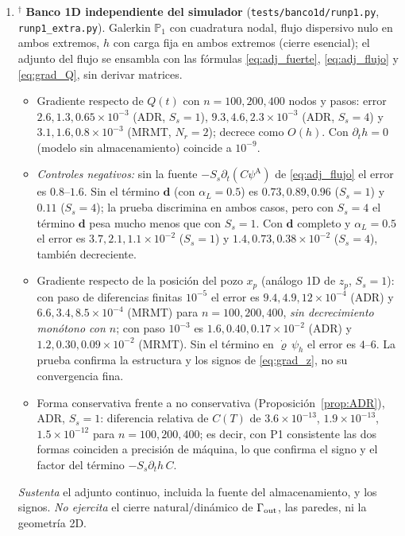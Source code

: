 \documentclass[11pt]{article}
\numberwithin{equation}{section}
\theoremstyle{plain}
\theoremstyle{definition}
\theoremstyle{remark}
\newcommand{\bd}{\mathbf{d}}
\newcommand{\Nuc}{\varrho}                      %
\newcommand{\pA}{\psi^{\mathrm A}}          %
\begin{document}
\begin{enumerate}[label=\textbf{V\arabic*.},leftmargin=*,itemsep=0.6em]
\item$^\dagger$ \textbf{Banco 1D independiente del simulador} (\texttt{tests/banco1d/runp1.py}, \texttt{runp1\_extra.py}). Galerkin $\mathbb P_1$ con cuadratura nodal, flujo dispersivo nulo en ambos extremos, $h$
  con carga fija en ambos extremos (cierre esencial); el adjunto del flujo se ensambla con las fórmulas \eqref{eq:adj_fuerte}, \eqref{eq:adj_flujo} y
  \eqref{eq:grad_Q}, sin derivar matrices.
  \begin{itemize}[nosep]
  \item Gradiente respecto de $Q(t)$ con $n=100,200,400$ nodos y pasos: error
  $2.6,1.3,0.65\times10^{-3}$ (ADR, $S_s=1$), $9.3,4.6,2.3\times10^{-3}$ (ADR, $S_s=4$) y $3.1,1.6,0.8\times10^{-3}$ (MRMT, $N_r=2$); decrece como $O(h)$.
  Con $\partial_th=0$ (modelo sin almacenamiento) coincide a $10^{-9}$.
  \item \emph{Controles negativos:} sin la fuente $-S_s\partial_t(C\pA)$ de \eqref{eq:adj_flujo} el error es $0.8$--$1.6$. Sin el término $\bd$ (con $\alpha_L=0.5$) es $0.73,0.89,0.96$ ($S_s=1$) y $0.11$ ($S_s=4$);
  la prueba discrimina en ambos casos, pero con $S_s=4$ el término $\bd$ pesa mucho menos que con $S_s=1$.
  Con $\bd$ completo y $\alpha_L=0.5$ el error es $3.7,2.1,1.1\times10^{-2}$ ($S_s=1$) y $1.4,0.73,0.38\times10^{-2}$ ($S_s=4$), también decreciente.
  \item Gradiente respecto de la posición del pozo $x_p$ (análogo 1D de $z_p$, $S_s=1$): con paso de diferencias finitas $10^{-5}$ el error es $9.4,4.9,12\times10^{-4}$ (ADR) y $6.6,3.4,8.5\times10^{-4}$ (MRMT) para $n=100,200,400$, \emph{sin decrecimiento monótono con $n$};
  con paso $10^{-3}$ es $1.6,0.40,0.17\times10^{-2}$ (ADR) y $1.2,0.30,0.09\times10^{-2}$ (MRMT). Sin el término en $\dot\Nuc\,\psi_h$ el error es $4$--$6$.
  La prueba confirma la estructura y los signos de \eqref{eq:grad_z}, no su convergencia fina.
  \item Forma conservativa frente a no conservativa (Proposición~\ref{prop:ADR}), ADR, $S_s=1$: diferencia relativa de $C(T)$ de $3.6\times10^{-13}$, $1.9\times10^{-13}$, $1.5\times10^{-12}$ para $n=100,200,400$; es decir, con P1 consistente las dos formas
  coinciden a precisión de máquina, lo que confirma el signo y el factor del término $-S_s\partial_th\,C$.
  \end{itemize}
  \emph{Sustenta} el adjunto continuo, incluida la fuente del almacenamiento, y los signos. \emph{No ejercita} el cierre natural/dinámico de $\Gamma_{\rm out}$, las paredes, ni la geometría 2D.


\end{enumerate}
\end{document}
